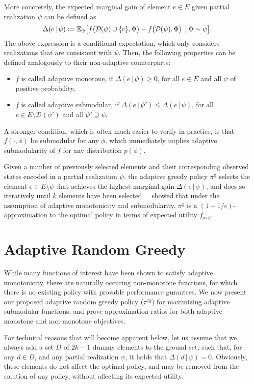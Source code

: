 \documentclass{article}
\newcommand{\defeq}{\vcentcolon=}
\newcommand{\mmid}{\,\vert\,}
\newcommand{\D}[2]{\Delta(#1\mmid#2)}
\newcommand{\pigr}{\pi^{\textrm{g}}}
\newcommand{\pig}{\pi^{\textrm{rg}}}
\newcommand{\favg}{f_{\mathrm{avg}}}
\newcommand{\dom}{\mathcal{D}}
\newcommand{\citet}[1]{\citeauthor{#1}~\shortcite{#1}}
\begin{document}
More concretely, the expected marginal gain of element $e \in E$ given partial realization $\psi$ can be defined as
\begin{align*}
  \D{e}{\psi} \defeq \E[\Phi]{f\big(\mathcal{D}(\psi) \cup \{e\}, \Phi\big) - f\big(\dom(\psi), \Phi\big)}[\Phi \sim \psi].
\end{align*}
The above expression is a conditional expectation, which only considers realizations that are consistent with $\psi$.
Then, the following properties can be defined analogously to their non-adaptive counterparts:
\begin{itemize}
\item $f$ is called adaptive monotone, if $\D{e}{\psi} \geq 0$, for all $e \in E$ and all $\psi$ of positive probability,
\item $f$ is called adaptive submodular, if $\D{e}{\psi'} \leq \D{e}{\psi}$, for all $e \in E \setminus \dom(\psi')$ and all $\psi' \supseteq \psi$.
\end{itemize}
A stronger condition, which is often much easier to verify in practice, is that $f(\cdot, \phi)$ be submodular for any $\phi$, which immediately implies adaptive submodularity of $f$ for any distribution $p(\phi)$.

Given a number of previously selected elements and their corresponding observed states encoded in a partial realization $\psi$, the adaptive greedy policy $\pigr$ selects the element $e \in E \setminus \psi$ that achieves the highest marginal gain $\D{e}{\psi}$, and does so iteratively until $k$ elements have been selected.
\citet{golovin11} showed that under the assumption of adaptive monotonicity and submodularity, $\pigr$ is a $(1-1/e)$-approximation to the optimal policy in terms of expected utility $\favg$.

\section{Adaptive Random Greedy}
While many functions of interest have been shown to satisfy adaptive monotonicity, there are naturally occuring non-monotone functions, for which there is no existing policy with provable performance gurantees.
We now present our proposed adaptive random greedy policy ($\pig$) for maximizing adaptive submodular functions, and prove approximation ratios for both adaptive monotone and non-monotone objectives.

For technical reasons that will become apparent below, let us assume that we always add a set $D$ of $2k - 1$ dummy elements to the ground set, such that, for any $d \in D$, and any partial realization $\psi$, it holds that $\D{d}{\psi} = 0$.
Obviously, these elements do not affect the optimal policy, and may be removed from the solution of any policy, without affecting its expected utility.
\end{document}
